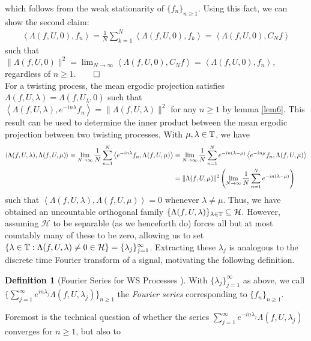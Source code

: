 \documentclass[11pt]{report}
\newcommand{\mc}[1]{\mathcal{#1}}
\newcommand{\ip}[2]{\left\langle#1,#2\right\rangle }
\newcommand{\1}[1]{\mathbbm{1}_{\{#1\}}}
\theoremstyle{definition}
\newtheorem{definition}{Definition}
\begin{document}
    which follows from the weak stationarity of $\{f_n\}_{n\geq
    1}$. Using this fact, we can show the second claim:
    \begin{align*}
        \ip{\Lambda(f,U,0)}{f_n}=\frac{1}{N}\sum_{k=1}^N\ip{\Lambda(f,U,0)}{f_k}=\ip{\Lambda(f,U,0)}{C_Nf}
    \end{align*}
    such that
    $\|\Lambda(f,U,0)\|^2=\lim_{N\rightarrow\infty}\ip{\Lambda(f,U,0)}{C_Nf}=\ip{\Lambda(f,U,0)}{f_n}$,
    regardless of $n\geq 1$.\hfill{$\qed$}\\[5pt]
    \indent For a twisting process, the mean ergodic projection satisfies
    $\Lambda(f,U,\lambda)=\Lambda(f,U_\lambda,0)$ such that
    $\ip{\Lambda(f,U,\lambda)}{e^{-in\lambda}f_n}=\|\Lambda(f,U,\lambda)\|^2$
    for any $n\geq 1$ by lemma \ref{lem6}. This result can be used to determine
    the inner product between the mean ergodic projection between two twisting
    processes. With $\mu,\lambda\in\mathbb{T}$, we have
    \begin{align}
        \ip{\Lambda(f,U,\lambda)}{\Lambda(f,U,\mu)}=\lim_{N\rightarrow\infty}\frac{1}{N}\sum_{n=1}^N\ip{e^{-in\lambda}f_n}{\Lambda(f,U,\mu)}&=\lim_{N\rightarrow\infty}\frac{1}{N}\sum_{n=1}^Ne^{-in(\lambda-\mu)}\ip{e^{-in\mu}f_n}{\Lambda(f,U,\mu)}\notag\\
        &=\|\Lambda(f,U,\mu)\|^2\left(\lim_{N\rightarrow\infty}\frac{1}{N}\sum_{n=1}^Ne^{-in(\lambda-\mu)}\right)\label{eq4}
    \end{align}
    such that $\ip{\Lambda(f,U,\lambda)}{\Lambda(f,U,\mu)}=0$ whenever
    $\lambda\neq\mu$. Thus, we have obtained an uncountable orthogonal family
    $\{\Lambda(f,U,\lambda)\}_{\lambda\in\mbb{T}}\subseteq\mc{H}$. However,
    assuming $\mc{H}$ to be separable (as we henceforth do) forces all but at
    most countably many of these to be zero, allowing us to set
    $\{\lambda\in\mbb{T}:\Lambda(f,U,\lambda)\neq
    0\in\mc{H}\}=\{\lambda_j\}_{j=1}^\infty$. Extracting these $\lambda_j$ is analogous
    to the discrete time Fourier transform of a signal, motivating the following definition.
    \begin{definition}[Fourier Series for WS Processes {\cite[\S6]{Fan_1946}}]\label{def4}
        With $\{\lambda_j\}_{j=1}^\infty$ as above, we call $\{\sum_{j=1}^\infty e^{in\lambda_j}\Lambda(f,U,\lambda_j)\}_{n\geq 1}$
        the \textit{Fourier series} corresponding to $\{f_n\}_{n\geq 1}$.
    \end{definition}
    Foremost is the technical question of whether the series $\sum_{j=1}^\infty
    e^{-in\lambda_j}\Lambda(f,U,\lambda_j)$ converges for $n\geq 1$, but also to
\end{document}
